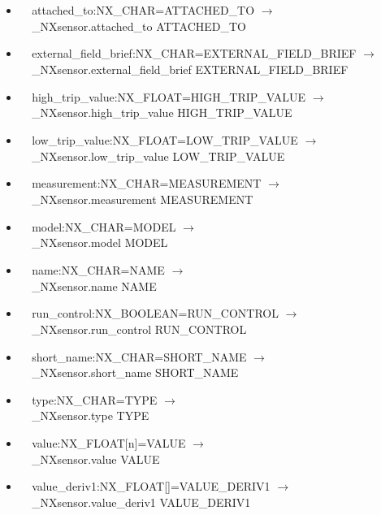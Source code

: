 \documentclass[11pt]{article}
\begin{document}
{{\begin{itemize}
\item{\verb|  |attached\_to:NX\_CHAR=ATTACHED\_TO $\rightarrow$\\
\verb|  |\_NXsensor.attached\_to ATTACHED\_TO}

\item{\verb|  |external\_field\_brief:NX\_CHAR=EXTERNAL\_FIELD\_BRIEF $\rightarrow$\\
\verb|  |\_NXsensor.external\_field\_brief EXTERNAL\_FIELD\_BRIEF}

\item{\verb|  |high\_trip\_value:NX\_FLOAT=HIGH\_TRIP\_VALUE $\rightarrow$\\
\verb|  |\_NXsensor.high\_trip\_value HIGH\_TRIP\_VALUE}

\item{\verb|  |low\_trip\_value:NX\_FLOAT=LOW\_TRIP\_VALUE $\rightarrow$\\
\verb|  |\_NXsensor.low\_trip\_value LOW\_TRIP\_VALUE}

\item{\verb|  |measurement:NX\_CHAR=MEASUREMENT $\rightarrow$\\
\verb|  |\_NXsensor.measurement MEASUREMENT}

\item{\verb|  |model:NX\_CHAR=MODEL $\rightarrow$\\
\verb|  |\_NXsensor.model MODEL}

\item{\verb|  |name:NX\_CHAR=NAME $\rightarrow$\\
\verb|  |\_NXsensor.name NAME}

\item{\verb|  |run\_control:NX\_BOOLEAN=RUN\_CONTROL $\rightarrow$\\
\verb|  |\_NXsensor.run\_control RUN\_CONTROL}

\item{\verb|  |short\_name:NX\_CHAR=SHORT\_NAME $\rightarrow$\\
\verb|  |\_NXsensor.short\_name SHORT\_NAME}

\item{\verb|  |type:NX\_CHAR=TYPE $\rightarrow$\\
\verb|  |\_NXsensor.type TYPE}

\item{\verb|  |value:NX\_FLOAT[n]=VALUE $\rightarrow$\\
\verb|  |\_NXsensor.value VALUE}

\item{\verb|  |value\_deriv1:NX\_FLOAT[]=VALUE\_DERIV1 $\rightarrow$\\
\verb|  |\_NXsensor.value\_deriv1 VALUE\_DERIV1}


\end{itemize}}}
\end{document}
